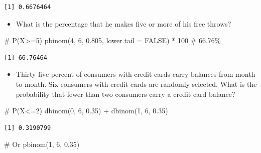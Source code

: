 \documentclass[
  letterpaper,
  DIV=11,
  numbers=noendperiod]{scrreprt}
\newenvironment{Shaded}{\begin{snugshade}}{\end{snugshade}}
\newcommand{\AttributeTok}[1]{\textcolor[rgb]{0.40,0.45,0.13}{#1}}
\newcommand{\CommentTok}[1]{\textcolor[rgb]{0.37,0.37,0.37}{#1}}
\newcommand{\ConstantTok}[1]{\textcolor[rgb]{0.56,0.35,0.01}{#1}}
\newcommand{\DecValTok}[1]{\textcolor[rgb]{0.68,0.00,0.00}{#1}}
\newcommand{\FloatTok}[1]{\textcolor[rgb]{0.68,0.00,0.00}{#1}}
\newcommand{\FunctionTok}[1]{\textcolor[rgb]{0.28,0.35,0.67}{#1}}
\newcommand{\NormalTok}[1]{\textcolor[rgb]{0.00,0.23,0.31}{#1}}
\newcommand{\SpecialCharTok}[1]{\textcolor[rgb]{0.37,0.37,0.37}{#1}}
\providecommand{\tightlist}{%
  \setlength{\itemsep}{0pt}\setlength{\parskip}{0pt}}\usepackage{longtable,booktabs,array}
\begin{document}
\begin{verbatim}
[1] 0.6676464
\end{verbatim}

\begin{itemize}
\tightlist
\item
  What is the percentage that he makes five or more of his free throws?
\end{itemize}

\begin{Shaded}
\begin{Highlighting}[]
\CommentTok{\# P(X\textgreater{}=5)}
\FunctionTok{pbinom}\NormalTok{(}\DecValTok{4}\NormalTok{, }\DecValTok{6}\NormalTok{, }\FloatTok{0.805}\NormalTok{, }\AttributeTok{lower.tail =} \ConstantTok{FALSE}\NormalTok{) }\SpecialCharTok{*} \DecValTok{100}  \CommentTok{\# 66.76\%}
\end{Highlighting}
\end{Shaded}

\begin{verbatim}
[1] 66.76464
\end{verbatim}

\begin{itemize}
\tightlist
\item
  Thirty five percent of consumers with credit cards carry balances from
  month to month. Six consumers with credit cards are randomly selected.
  What is the probability that fewer than two consumers carry a credit
  card balance?
\end{itemize}

\begin{Shaded}
\begin{Highlighting}[]
\CommentTok{\# P(X\textless{}=2)}
\FunctionTok{dbinom}\NormalTok{(}\DecValTok{0}\NormalTok{, }\DecValTok{6}\NormalTok{, }\FloatTok{0.35}\NormalTok{) }\SpecialCharTok{+} \FunctionTok{dbinom}\NormalTok{(}\DecValTok{1}\NormalTok{, }\DecValTok{6}\NormalTok{, }\FloatTok{0.35}\NormalTok{)}
\end{Highlighting}
\end{Shaded}

\begin{verbatim}
[1] 0.3190799
\end{verbatim}

\begin{Shaded}
\begin{Highlighting}[]
\CommentTok{\# Or}
\FunctionTok{pbinom}\NormalTok{(}\DecValTok{1}\NormalTok{, }\DecValTok{6}\NormalTok{, }\FloatTok{0.35}\NormalTok{)}
\end{Highlighting}
\end{Shaded}
\end{document}
